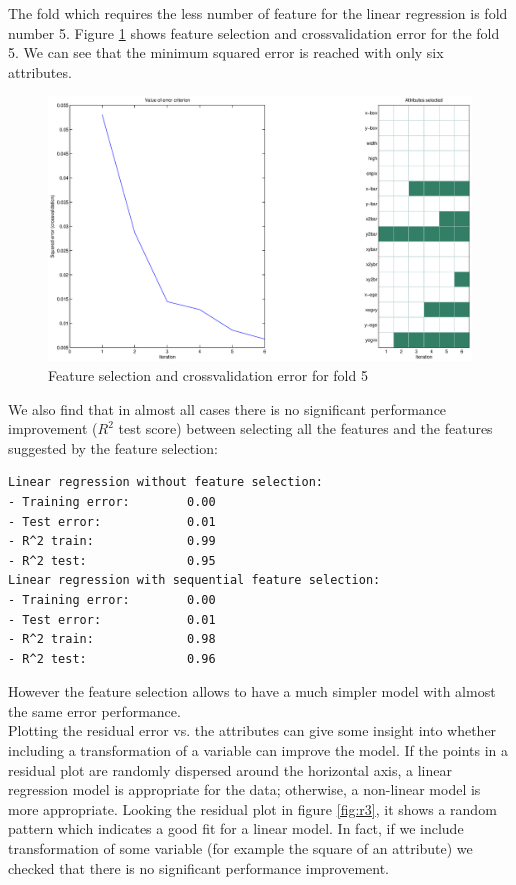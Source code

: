 The fold which requires the less number of feature for the linear regression is fold number 5. Figure \ref{fig:r2} shows feature selection and crossvalidation error for the fold 5. We can see that the minimum squared error is reached with only six attributes.

\begin{figure}[htbp]
\center
\includegraphics[width = 1.0\textwidth]{figures/r2}
\caption{Feature selection and crossvalidation error for fold 5}
\label{fig:r2}
\end{figure}

We also find that in almost all cases there is no significant performance improvement ($R^2$ test score) between selecting all the features and the features suggested by the feature selection:
\begin{verbatim}
Linear regression without feature selection:
- Training error:        0.00
- Test error:            0.01
- R^2 train:             0.99
- R^2 test:              0.95
Linear regression with sequential feature selection:
- Training error:        0.00
- Test error:            0.01
- R^2 train:             0.98
- R^2 test:              0.96
\end{verbatim}

However the feature selection allows to have a much simpler model with almost the same error performance.\\

Plotting the residual error vs. the attributes can give some insight into whether including a transformation of a variable can improve the model. If the points in a residual plot are randomly dispersed around the horizontal axis, a linear regression model is appropriate for the data; otherwise, a non-linear model is more appropriate.
Looking the residual plot in figure \ref{fig:r3}, it shows a random pattern which indicates a good fit for a linear model.
In fact, if we include transformation of some variable (for example the square of an attribute) we checked that there is no significant performance improvement.

